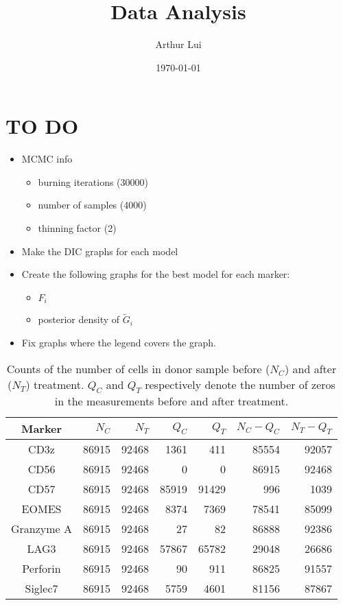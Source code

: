 \documentclass[12pt]{article} %
\title{Data Analysis}
\author{Arthur Lui}
\date{\today} %
\begin{document}
\maketitle

\section{TO DO}
\begin{itemize}
  \item MCMC info
  \begin{itemize}
    \item burning iterations (30000)
    \item number of samples (4000)
    \item thinning factor (2)
  \end{itemize}
  \item Make the DIC graphs for each model
  \item Create the following graphs for the best model for each marker:
  \begin{itemize}
    \item $F_i$
    \item posterior density of $\tilde G_i$
  \end{itemize}
  \item Fix graphs where the legend covers the graph. 
\end{itemize}

\begin{table}[!t]
  \centering
  \begin{tabular}{|c|rrrrrr|}
    \hline
    Marker & $N_C$ & $N_T$ & $Q_C$ & $Q_T$ & $N_C - Q_C$ & $N_T - Q_T$ \\ 
    \hline
    CD3z       & 86915 & 92468 &  1361 &   411 & 85554 & 92057 \\ 
    CD56       & 86915 & 92468 &     0 &     0 & 86915 & 92468 \\ 
    CD57       & 86915 & 92468 & 85919 & 91429 &   996 &  1039 \\ 
    EOMES      & 86915 & 92468 &  8374 &  7369 & 78541 & 85099 \\ 
    Granzyme A & 86915 & 92468 &    27 &    82 & 86888 & 92386 \\ 
    LAG3       & 86915 & 92468 & 57867 & 65782 & 29048 & 26686 \\ 
    Perforin   & 86915 & 92468 &    90 &   911 & 86825 & 91557 \\ 
    Siglec7    & 86915 & 92468 &  5759 &  4601 & 81156 & 87867 \\
    \hline
  \end{tabular} 
  \caption{Counts of the number of cells in donor sample before ($N_C$) and
  after ($N_T$) treatment. $Q_C$ and $Q_T$ respectively denote the number
  of zeros in the measurements before and after treatment.}
  \label{tab:data-counts}
\end{table}
\end{document}
